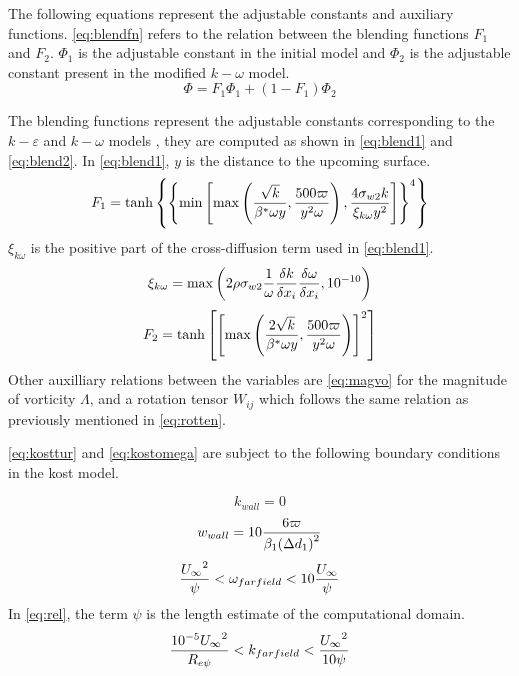 \documentclass[english]{kththesis}
\begin{document}
The following equations represent the adjustable constants and auxiliary functions.
\ref{eq:blendfn} refers to the relation between the blending functions $F_1$ and $F_2$. $\Phi _1$ is the adjustable constant in the initial model and $\Phi _2$ is the adjustable constant present in the modified $k-\omega$ model.
\begin{equation}\label{eq:blendfn}\Phi  = {F_1}{\Phi _1} + (1 - {F_1}){\Phi _2}\end{equation}

The blending functions represent the adjustable constants corresponding to the $k-\varepsilon$ and $k-\omega$ models , they are computed as shown in \ref{eq:blend1} and \ref{eq:blend2}.
In \ref{eq:blend1}, $y$ is the distance to the upcoming surface.
\begin{equation}\label{eq:blend1}{F_1} = \tanh \left\{ {{{\left\{ {\min \left[ {\max \left( {{{\sqrt k } \over {{\beta ^*}\omega y}},{{500\varpi } \over {{y^2}\omega }}} \right),{{4{\sigma _{w2}}k} \over {{\xi _{k\omega }}{y^2}}}} \right]} \right\}}^4}} \right\}\end{equation}
$\xi _{k\omega }$ is the positive part of the cross-diffusion term used in \ref{eq:blend1}.
\begin{equation}{\xi _{k\omega }} = \max \left( {2\rho {\sigma _{w2}}{1 \over \omega }{{\delta k} \over {\delta {x_i}}}{{\delta \omega } \over {\delta {x_i}}}{{,10}^{ - 10}}} \right)\end{equation}
\begin{equation}\label{eq:blend2}{F_2} = \tanh \left[ {{{\left[ {\max \left( {{{2\sqrt k } \over {{\beta ^*}\omega y}},{{500\varpi } \over {{y^2}\omega }}} \right)} \right]}^2}} \right]\end{equation}
Other auxilliary relations between the variables are \ref{eq:magvo} for the magnitude of vorticity $\Lambda$, and a rotation tensor ${{W_{ij}}}$ which follows the same relation as previously mentioned in \ref{eq:rotten}.

\ref{eq:kosttur} and \ref{eq:kostomega} are subject to the following boundary conditions in the \acrshort{kost} model.

\begin{equation}{k_{wall}} = 0\end{equation} 
\begin{equation}{{w_{wall}} = 10{{6\varpi } \over {{\beta _1}{{(\Delta {d_1})}^2}}}}\end{equation} 
\begin{equation}\label{eq:rel}{{{U_\infty }^2} \over {\psi}} < {\omega _{farfield}} < 10{{{U_\infty }} \over \psi}\end{equation}
In \ref{eq:rel}, the term $\psi$ is the length estimate of the computational domain.
\begin{equation}{{{{10}^{ - 5}}{U_\infty }^2} \over {{R_{e\psi }}}} < {k_{farfield}} < {{{U_\infty }^2} \over {10\psi }}\end{equation}
\end{document}

